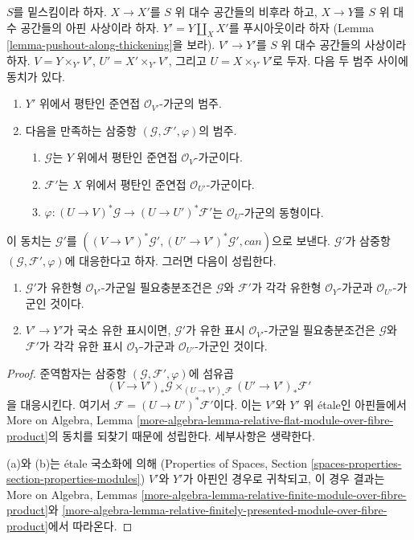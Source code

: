 \begin{lemma}
\label{lemma-space-over-pushout-flat-modules}
$S$를 밑스킴이라 하자. $X \to X'$를 $S$ 위 대수 공간들의 비후라 하고,
$X \to Y$를 $S$ 위 대수 공간들의 아핀 사상이라 하자.
$Y' = Y \amalg_X X'$를 푸시아웃이라 하자
(Lemma \ref{lemma-pushout-along-thickening}을 보라).
$V' \to Y'$를 $S$ 위 대수 공간들의 사상이라 하자.
$V = Y \times_{Y'} V'$, $U' = X' \times_{Y'} V'$, 그리고
$U = X \times_{Y'} V'$로 두자. 다음 두 범주 사이에 동치가 있다.
\begin{enumerate}
\item $Y'$ 위에서 평탄인 준연접 $\mathcal{O}_{V'}$-가군의 범주.
\item 다음을 만족하는 삼중항 $(\mathcal{G}, \mathcal{F}', \varphi)$의 범주.
\begin{enumerate}
\item $\mathcal{G}$는 $Y$ 위에서 평탄인 준연접 $\mathcal{O}_V$-가군이다.
\item $\mathcal{F}'$는 $X$ 위에서 평탄인 준연접
$\mathcal{O}_{U'}$-가군이다.
\item $\varphi : (U \to V)^*\mathcal{G} \to
(U \to U')^*\mathcal{F}'$는 $\mathcal{O}_U$-가군의 동형이다.
\end{enumerate}
\end{enumerate}
이 동치는 $\mathcal{G}'$를
$((V \to V')^*\mathcal{G}', (U' \to V')^*\mathcal{G}', can)$으로 보낸다.
$\mathcal{G}'$가 삼중항 $(\mathcal{G}, \mathcal{F}', \varphi)$에
대응한다고 하자. 그러면 다음이 성립한다.
\begin{enumerate}
\item[(a)] $\mathcal{G}'$가 유한형 $\mathcal{O}_{V'}$-가군일 필요충분조건은
$\mathcal{G}$와 $\mathcal{F}'$가 각각 유한형 $\mathcal{O}_Y$-가군과
$\mathcal{O}_{U'}$-가군인 것이다.
\item[(b)] $V' \to Y'$가 국소 유한 표시이면,
$\mathcal{G}'$가 유한 표시 $\mathcal{O}_{V'}$-가군일 필요충분조건은
$\mathcal{G}$와 $\mathcal{F}'$가 각각 유한 표시 $\mathcal{O}_Y$-가군과
$\mathcal{O}_{U'}$-가군인 것이다.
\end{enumerate}
\end{lemma}

\begin{proof}
준역함자는 삼중항 $(\mathcal{G}, \mathcal{F}', \varphi)$에 섬유곱
$$
(V \to V')_*\mathcal{G}
\times_{(U \to V')_*\mathcal{F}}
(U' \to V')_*\mathcal{F}'
$$
을 대응시킨다. 여기서 $\mathcal{F} = (U \to U')^*\mathcal{F}'$이다.
이는 $V'$와 $Y'$ 위 \'etale인 아핀들에서 More on Algebra, Lemma
\ref{more-algebra-lemma-relative-flat-module-over-fibre-product}의
동치를 되찾기 때문에 성립한다. 세부사항은 생략한다.

\medskip\noindent
(a)와 (b)는 \'etale 국소화에 의해
(Properties of Spaces, Section
\ref{spaces-properties-section-properties-modules})
$V'$와 $Y'$가 아핀인 경우로 귀착되고, 이 경우 결과는 More on Algebra,
Lemmas \ref{more-algebra-lemma-relative-finite-module-over-fibre-product}와
\ref{more-algebra-lemma-relative-finitely-presented-module-over-fibre-product}에서
따라온다.
\end{proof}



